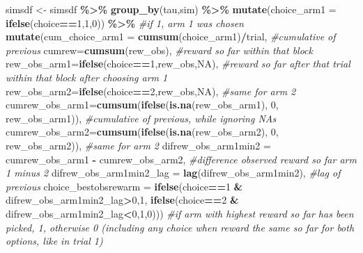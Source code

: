 \documentclass[
]{article}
\newenvironment{Shaded}{\begin{snugshade}}{\end{snugshade}}
\newcommand{\AttributeTok}[1]{\textcolor[rgb]{0.13,0.29,0.53}{#1}}
\newcommand{\CommentTok}[1]{\textcolor[rgb]{0.56,0.35,0.01}{\textit{#1}}}
\newcommand{\ConstantTok}[1]{\textcolor[rgb]{0.56,0.35,0.01}{#1}}
\newcommand{\DecValTok}[1]{\textcolor[rgb]{0.00,0.00,0.81}{#1}}
\newcommand{\FunctionTok}[1]{\textcolor[rgb]{0.13,0.29,0.53}{\textbf{#1}}}
\newcommand{\NormalTok}[1]{#1}
\newcommand{\OtherTok}[1]{\textcolor[rgb]{0.56,0.35,0.01}{#1}}
\newcommand{\SpecialCharTok}[1]{\textcolor[rgb]{0.81,0.36,0.00}{\textbf{#1}}}
\begin{document}
\begin{Shaded}
\begin{Highlighting}[]
\NormalTok{simsdf }\OtherTok{\textless{}{-}}\NormalTok{ simsdf }\SpecialCharTok{\%\textgreater{}\%}
  \FunctionTok{group\_by}\NormalTok{(tau,sim) }\SpecialCharTok{\%\textgreater{}\%}
  \FunctionTok{mutate}\NormalTok{(}\AttributeTok{choice\_arm1 =} \FunctionTok{ifelse}\NormalTok{(choice}\SpecialCharTok{==}\DecValTok{1}\NormalTok{,}\DecValTok{1}\NormalTok{,}\DecValTok{0}\NormalTok{)) }\SpecialCharTok{\%\textgreater{}\%} \CommentTok{\#if 1, arm 1 was chosen}
  \FunctionTok{mutate}\NormalTok{(}\AttributeTok{cum\_choice\_arm1 =} \FunctionTok{cumsum}\NormalTok{(choice\_arm1)}\SpecialCharTok{/}\NormalTok{trial, }\CommentTok{\#cumulative of previous}
         \AttributeTok{cumrew=}\FunctionTok{cumsum}\NormalTok{(rew\_obs), }\CommentTok{\#reward so far within that block}
         \AttributeTok{rew\_obs\_arm1=}\FunctionTok{ifelse}\NormalTok{(choice}\SpecialCharTok{==}\DecValTok{1}\NormalTok{,rew\_obs,}\ConstantTok{NA}\NormalTok{), }\CommentTok{\#reward so far after that trial within that block after choosing arm 1}
         \AttributeTok{rew\_obs\_arm2=}\FunctionTok{ifelse}\NormalTok{(choice}\SpecialCharTok{==}\DecValTok{2}\NormalTok{,rew\_obs,}\ConstantTok{NA}\NormalTok{), }\CommentTok{\#same for arm 2}
         \AttributeTok{cumrew\_obs\_arm1=}\FunctionTok{cumsum}\NormalTok{(}\FunctionTok{ifelse}\NormalTok{(}\FunctionTok{is.na}\NormalTok{(rew\_obs\_arm1), }\DecValTok{0}\NormalTok{, rew\_obs\_arm1)),   }\CommentTok{\#cumulative of previous, while ignoring NAs}
                                \AttributeTok{cumrew\_obs\_arm2=}\FunctionTok{cumsum}\NormalTok{(}\FunctionTok{ifelse}\NormalTok{(}\FunctionTok{is.na}\NormalTok{(rew\_obs\_arm2), }\DecValTok{0}\NormalTok{, rew\_obs\_arm2)), }\CommentTok{\#same for arm 2}
         \AttributeTok{difrew\_obs\_arm1min2 =}\NormalTok{ cumrew\_obs\_arm1 }\SpecialCharTok{{-}}\NormalTok{ cumrew\_obs\_arm2, }\CommentTok{\#difference observed reward so far arm 1 minus 2}
         \AttributeTok{difrew\_obs\_arm1min2\_lag =} \FunctionTok{lag}\NormalTok{(difrew\_obs\_arm1min2), }\CommentTok{\#lag of previous}
         \AttributeTok{choice\_bestobsrewarm =} \FunctionTok{ifelse}\NormalTok{(choice}\SpecialCharTok{==}\DecValTok{1} \SpecialCharTok{\&}\NormalTok{ difrew\_obs\_arm1min2\_lag}\SpecialCharTok{\textgreater{}}\DecValTok{0}\NormalTok{,}\DecValTok{1}\NormalTok{,}
                                       \FunctionTok{ifelse}\NormalTok{(choice}\SpecialCharTok{==}\DecValTok{2} \SpecialCharTok{\&}\NormalTok{ difrew\_obs\_arm1min2\_lag}\SpecialCharTok{\textless{}}\DecValTok{0}\NormalTok{,}\DecValTok{1}\NormalTok{,}\DecValTok{0}\NormalTok{))) }\CommentTok{\#if arm with highest reward so far has been picked, 1, otherwise 0 (including any choice when reward the same so far for both options, like in trial 1) }

\end{Highlighting}
\end{Shaded}
\end{document}
